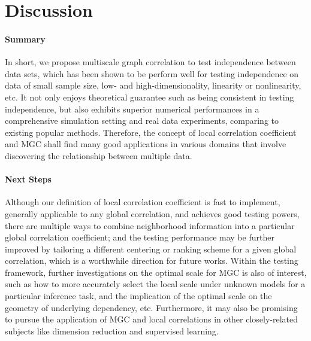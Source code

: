 \documentclass[11pt]{article}
\begin{document}
\section{Discussion}
\label{conclu}

\paragraph{Summary}
In short, we propose multiscale graph correlation to test independence between data sets, which has been shown to be perform well for testing independence on data of small sample size, low- and high-dimensionality, linearity or nonlinearity, etc. It not only enjoys theoretical guarantee such as being consistent in testing independence, but also exhibits superior numerical performances in a comprehensive simulation setting and real data experiments, comparing to existing popular methods. Therefore, the concept of local correlation coefficient and MGC shall find many good applications in various domains that involve discovering the relationship between multiple data.  %

\paragraph{Next Steps}
Although our definition of local correlation coefficient is fast to implement, generally applicable to any global correlation, and achieves good testing powers, there are multiple ways to combine neighborhood information into a particular global correlation coefficient; and the testing performance may be further improved by tailoring a different centering or ranking scheme for a given global correlation, which is a worthwhile direction for future works. Within the testing framework, further investigations on the optimal scale for MGC is also of interest, such as how to more accurately select the local scale under unknown models for a particular inference task, and the implication of the optimal scale on the geometry of underlying dependency, etc. Furthermore, it may also be promising to pursue the application of MGC and local correlations in other closely-related subjects like dimension reduction and supervised learning. 
\end{document}
